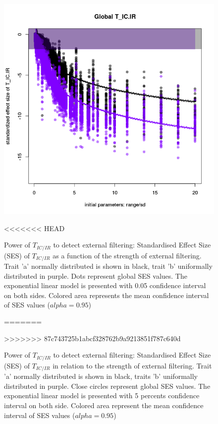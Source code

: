 \documentclass[12pt]{article}\usepackage[]{graphicx}\usepackage[]{color}
\makeatletter
\def\maxwidth{ %
  \ifdim\Gin@nat@width>\linewidth
    \linewidth
  \else
    \Gin@nat@width
  \fi
}
\newenvironment{knitrout}{}{} %
\makeatother
\begin{document}
\begin{landscape}
\begin{table}[ht]
{\begin{table}[ht]
{\begin{table}[ht]
{\begin{knitrout}
\begin{figure}
{\centering \includegraphics[width=\maxwidth]{figure/Ex_conc_plot1-1} 

}

<<<<<<< HEAD
\caption[Power of $T_{IC/IR}$ to detect external filtering]{Power of $T_{IC/IR}$ to detect external filtering: Standardised Effect Size (SES) of $T_{IC/IR}$ as a function of the strength of external filtering. Trait 'a' normally distributed is shown in black, trait 'b' uniformally distributed in purple. Dots represent global SES values. The exponential linear model is presented with 0.05 confidence interval on both sides. Colored area represents the mean confidence interval of SES values ($alpha = 0.95$)}\label{fig:Ex_conc_plot1}
=======
\caption[Power of $T_{IC/IR}$ to detect external filtering]{Power of $T_{IC/IR}$ to detect external filtering: Standardised Effect Size (SES) of $T_{IC/IR}$ in relation to the strength of external filtering. Trait 'a' normally distributed is shown in black, traits 'b' uniformally distributed in purple. Close circles represent global SES values. The exponential linear model is presented with 5 percents confidence interval on both side. Colored area represent the mean confidence interval of SES values ($alpha = 0.95$)}\label{fig:Ex_conc_plot1}
>>>>>>> 87c743725b1abcf328762b9a9213851f787c640d
\end{figure}



\end{knitrout}}
\end{table}}
\end{table}}
\end{table}
\end{landscape}
\end{document}
